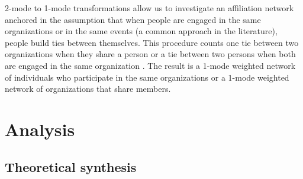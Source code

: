 \documentclass[a4paper, 12pt, openright, oneside, german, french, brazil, english]{abntex2}
\begin{document}
        2-mode to 1-mode transformations allow us to investigate an affiliation network anchored in the assumption that when people are engaged in the same organizations or in the same events (a common approach in the literature), people build ties between themselves. This procedure counts one tie between two organizations when they share a person or a tie between two persons when both are engaged in the same organization \cite{brailly2016market,lazega2014redes}. The result is a 1-mode weighted network of individuals who participate in the same organizations or a 1-mode weighted network of organizations that share members.
	


        
	\chapter{Analysis}
	
	\section{Theoretical synthesis}

	
\end{document}
